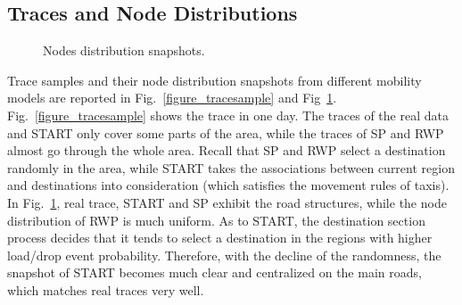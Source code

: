 \subsection{Traces and Node Distributions}
\begin{figure}[!t]
\centering
{}
\caption{Nodes distribution snapshots.}\label{figure_trace_snapshots}
\end{figure}

Trace samples and their node distribution snapshots from different mobility models are reported in Fig.~\ref{figure_tracesample} and Fig~\ref{figure_trace_snapshots}. Fig.~\ref{figure_tracesample} shows the trace in one day. The traces of the real data and START only cover some parts of the area, while the traces of SP and RWP almost go through the whole area. Recall that SP and RWP select a destination randomly in the area, while START takes the associations between current region and destinations into consideration (which satisfies the movement rules of taxis). In Fig.~\ref{figure_trace_snapshots}, real trace, START and SP exhibit the road structures, while the node distribution of RWP is much uniform. As to START, the destination section process decides that it tends to select a destination in the regions with higher load/drop event probability. Therefore, with the decline of the randomness, the snapshot of START becomes much clear and centralized on the main roads, which matches real traces very well.


